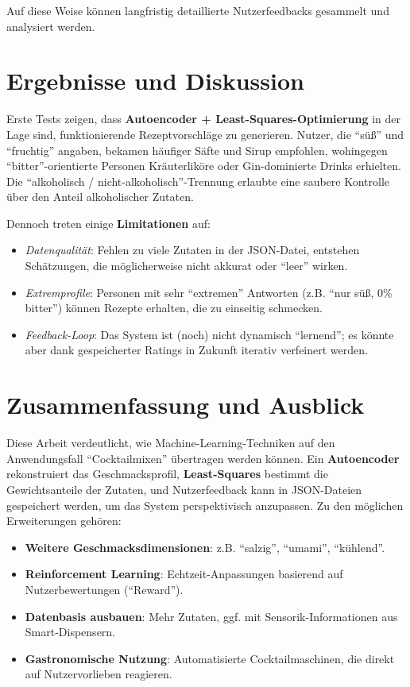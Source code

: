 \documentclass[12pt,a4paper]{report}
\begin{document}
Auf diese Weise können langfristig detaillierte Nutzerfeedbacks gesammelt und analysiert werden.

\section{Ergebnisse und Diskussion}
Erste Tests zeigen, dass \textbf{Autoencoder + Least-Squares-Optimierung} in der Lage sind, funktionierende Rezeptvorschläge zu generieren. Nutzer, die \enquote{süß} und \enquote{fruchtig} angaben, bekamen häufiger Säfte und Sirup empfohlen, wohingegen \enquote{bitter}-orientierte Personen Kräuterliköre oder Gin-dominierte Drinks erhielten. Die \enquote{alkoholisch / nicht-alkoholisch}-Trennung erlaubte eine saubere Kontrolle über den Anteil alkoholischer Zutaten.

Dennoch treten einige \textbf{Limitationen} auf:
\begin{itemize}
  \item \textit{Datenqualität}: Fehlen zu viele Zutaten in der JSON-Datei, entstehen Schätzungen, die möglicherweise nicht akkurat oder \enquote{leer} wirken.
  \item \textit{Extremprofile}: Personen mit sehr \enquote{extremen} Antworten (z.B. \enquote{nur süß, 0\% bitter}) können Rezepte erhalten, die zu einseitig schmecken.
  \item \textit{Feedback-Loop}: Das System ist (noch) nicht dynamisch \enquote{lernend}; es könnte aber dank gespeicherter Ratings in Zukunft iterativ verfeinert werden.
\end{itemize}

\section{Zusammenfassung und Ausblick}
Diese Arbeit verdeutlicht, wie Machine-Learning-Techniken auf den Anwendungsfall \enquote{Cocktailmixen} übertragen werden können. Ein \textbf{Autoencoder} rekonstruiert das Geschmacksprofil, \textbf{Least-Squares} bestimmt die Gewichtsanteile der Zutaten, und Nutzerfeedback kann in JSON-Dateien gespeichert werden, um das System perspektivisch anzupassen. Zu den möglichen Erweiterungen gehören:

\begin{itemize}
  \item \textbf{Weitere Geschmacksdimensionen}: z.B. \enquote{salzig}, \enquote{umami}, \enquote{kühlend}.
  \item \textbf{Reinforcement Learning}: Echtzeit-Anpassungen basierend auf Nutzerbewertungen (\enquote{Reward}).
  \item \textbf{Datenbasis ausbauen}: Mehr Zutaten, ggf. mit Sensorik-Informationen aus Smart-Dispensern.
  \item \textbf{Gastronomische Nutzung}: Automatisierte Cocktailmaschinen, die direkt auf Nutzervorlieben reagieren.
\end{itemize}
\end{document}
